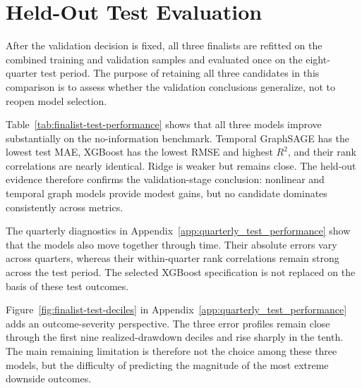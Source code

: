 \section{Held-Out Test Evaluation}
\label{sec:held_out_performance}

After the validation decision is fixed, all three finalists are refitted on the combined training and validation samples and evaluated once on the eight-quarter test period. The purpose of retaining all three candidates in this comparison is to assess whether the validation conclusions generalize, not to reopen model selection.



\noindent
Table~\ref{tab:finalist-test-performance} shows that all three models improve substantially on the no-information benchmark. Temporal GraphSAGE has the lowest test MAE, XGBoost has the lowest RMSE and highest $R^2$, and their rank correlations are nearly identical. Ridge is weaker but remains close. The held-out evidence therefore confirms the validation-stage conclusion: nonlinear and temporal graph models provide modest gains, but no candidate dominates consistently across metrics.

The quarterly diagnostics in Appendix~\ref{app:quarterly_test_performance} show that the models also move together through time. Their absolute errors vary across quarters, whereas their within-quarter rank correlations remain strong across the test period. The selected XGBoost specification is not replaced on the basis of these test outcomes.

Figure~\ref{fig:finalist-test-deciles} in Appendix~\ref{app:quarterly_test_performance} adds an outcome-severity perspective. The three error profiles remain close through the first nine realized-drawdown deciles and rise sharply in the tenth. The main remaining limitation is therefore not the choice among these three models, but the difficulty of predicting the magnitude of the most extreme downside outcomes.
